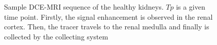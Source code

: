 \begin{figure}[H]
		
		 \quad
			 \quad
			\vspace{-4pt}
			
		 \quad
	 \quad
\vspace{0.05cm}
\caption[Sample DCE-MRI sequence of the healthy kidneys.]{Sample DCE-MRI sequence of the healthy kidneys. $Tp$ is a given time point. Firstly, the signal enhancement is observed in the renal cortex. Then, the tracer travels to the renal medulla and finally is collected by the collecting system}
\label{fig:set}
\end{figure}

